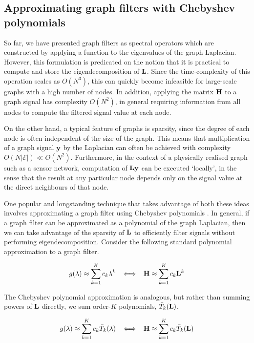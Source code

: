 \subsection{Approximating graph filters with Chebyshev polynomials}

\label{sec:Chebyshev}

So far, we have presented graph filters as spectral operators which are constructed by applying a function to the eigenvalues of the graph Laplacian. However, this formulation is predicated on the notion that it is practical to compute and store the eigendecomposition of $\mathbf{L}$. Since the time-complexity of this operation scales as $O(N^3)$, this can quickly become infeasible for large-scale graphs with a high number of nodes. In addition, applying the matrix $\mathbf{H}$ to a graph signal has complexity $O(N^2)$, in general requiring information from all nodes to compute the filtered signal value at each node. 

On the other hand, a typical feature of graphs is sparsity, since the degree of each node is often independent of the size of the graph. This means that multiplication of a graph signal $\mathbf{y}$ by the Laplacian can often be achieved with complexity $O(N|\mathcal{E}|) \ll O(N^2)$. Furthermore, in the context of a physically realised graph such as a sensor network, computation of $\mathbf{L} \mathbf{y}$ can be executed `locally', in the sense that the result at any particular node depends only on the  signal value at the direct neighbours of that node. 

One popular and longstanding technique that takes advantage of both these ideas involves approximating a graph filter using Chebyshev polynomials \citep{Shuman2018}. In general, if a graph filter can be approximated as a polynomial of the graph Laplacian, then we can take advantage of the sparsity of $\mathbf{L}$ to efficiently filter signals without performing eigendecomposition. Consider the following standard polynomial approximation to a graph filter. 

\begin{equation}
    \label{eq:poly_lap}
    g(\lambda) \approx \sum_{k=1}^K c_k \lambda^k \;\; \iff \;\; \mathbf{H} \approx \sum_{k=1}^K c_k \mathbf{L}^k
\end{equation}

The Chebyshev polynomial approximation is analogous, but rather than summing powers of $\mathbf{L}$ directly, we sum order-$K$ polynomials, $\bar{T}_k(\mathbf{L})$. 

\begin{equation}
    \label{eq:cheb_lap}
    g(\lambda) \approx \sum_{k=1}^K c_k \bar{T}_k(\lambda) \;\; \iff \;\; \mathbf{H} \approx \sum_{k=1}^K c_k \bar{T}_k(\mathbf{L})
\end{equation}


